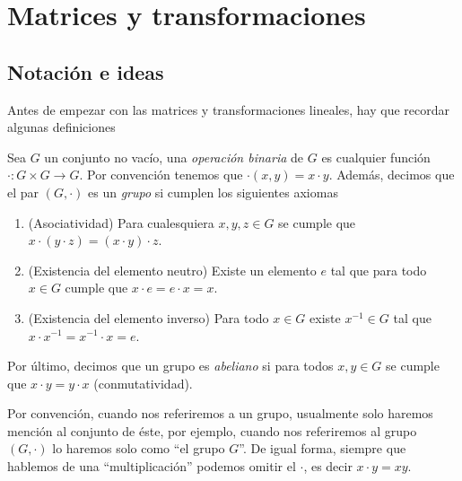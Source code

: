 \chapter{Matrices y transformaciones}

\section{Notación e ideas}

Antes de empezar con las matrices y transformaciones lineales, hay que recordar algunas definiciones

\begin{defi}
  Sea $G$ un conjunto no vacío, una \emph{operación binaria} de $G$ es cualquier función $\cdot \colon G \times G \to G$. Por convención tenemos que $\cdot(x,y) = x \cdot y$. Además, decimos que el par $(G, \cdot)$ es un \emph{grupo} si cumplen los siguientes axiomas
  \begin{enumerate}
    \item (Asociatividad) Para cualesquiera $x, y, z \in G$ se cumple que $x\cdot(y\cdot z) = (x\cdot y)\cdot z$.
    \item (Existencia del elemento neutro) Existe un elemento $e$ tal que para todo $x \in G$ cumple que $x\cdot e = e\cdot x = x$.
    \item (Existencia del elemento inverso) Para todo $x \in G$ existe $x^{-1} \in G$ tal que $x\cdot x^{-1} = x^{-1}\cdot x = e$.
  \end{enumerate}

  Por último, decimos que un grupo es \emph{abeliano} si para todos $x, y \in G$ se cumple que $x\cdot y = y\cdot x$ (conmutatividad).
\end{defi}

Por convención, cuando nos referiremos a un grupo, usualmente solo haremos mención al conjunto de éste, por ejemplo, cuando nos referiremos al grupo $(G, \cdot)$ lo haremos solo como ``el grupo $G$''. De igual forma, siempre que hablemos de una ``multiplicación'' podemos omitir el $\cdot$, es decir $x \cdot y = xy$.

